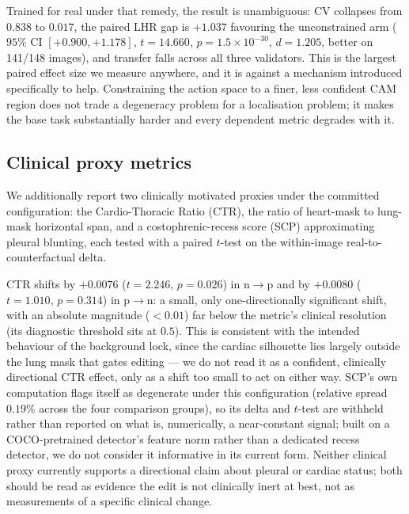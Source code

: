 \documentclass[10pt,twocolumn,letterpaper]{article}
\begin{document}
Trained for real under that remedy, the result is unambiguous: CV
collapses from $0.838$ to $0.017$, the paired LHR gap is $+1.037$
favouring the unconstrained arm ($95\%$ CI $[+0.900,+1.178]$,
$t=14.660$, $p=1.5\times10^{-30}$, $d=1.205$, better on 141/148 images),
and transfer falls across all three validators. This is the largest
paired effect size we measure anywhere, and it is against a mechanism
introduced specifically to help. Constraining the action space to a
finer, less confident CAM region does not trade a degeneracy problem for
a localisation problem; it makes the base task substantially harder and
every dependent metric degrades with it.

\subsection{Clinical proxy metrics}
\label{sec:clinical}
We additionally report two clinically motivated proxies under the
committed configuration: the Cardio-Thoracic Ratio (CTR), the ratio of
heart-mask to lung-mask horizontal span, and a costophrenic-recess score
(SCP) approximating pleural blunting, each tested with a paired
$t$-test on the within-image real-to-counterfactual delta.

CTR shifts by $+0.0076$ ($t=2.246$, $p=0.026$) in n$\to$p and by
$+0.0080$ ($t=1.010$, $p=0.314$) in p$\to$n: a small, only
one-directionally significant shift, with an absolute magnitude
($<0.01$) far below the metric's clinical resolution (its diagnostic
threshold sits at $0.5$). This is consistent with the intended behaviour
of the background lock, since the cardiac silhouette lies largely
outside the lung mask that gates editing --- we do not read it as a
confident, clinically directional CTR effect, only as a shift too small
to act on either way. SCP's own computation flags itself as degenerate
under this configuration (relative spread $0.19\%$ across the four
comparison groups), so its delta and $t$-test are withheld rather than
reported on what is, numerically, a near-constant signal; built on a
COCO-pretrained detector's feature norm rather than a dedicated recess
detector, we do not consider it informative in its current form. Neither
clinical proxy currently supports a directional claim about pleural or
cardiac status; both should be read as evidence the edit is not
clinically inert at best, not as measurements of a specific clinical
change.
\end{document}
